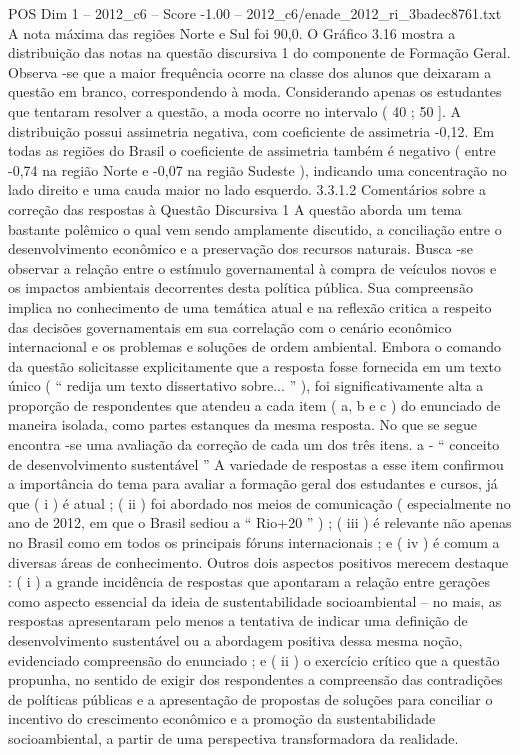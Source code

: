 \begin{textsample}{POS Dim 1 – 2012\_c6 – Score -1.00 – 2012\_c6/enade\_2012\_ri\_3badec8761.txt}
A nota máxima das regiões Norte e Sul foi 90,0.
O Gráfico 3.16 mostra a distribuição das notas na questão discursiva 1 do componente de Formação Geral.
Observa -se que a maior frequência ocorre na classe dos alunos que deixaram a questão em branco, correspondendo à moda.
Considerando apenas os estudantes que tentaram resolver a questão, a moda ocorre no intervalo ( 40 ; 50 ].
A distribuição possui assimetria negativa, com coeficiente de assimetria -0,12.
Em todas as regiões do Brasil o coeficiente de assimetria também é negativo ( entre -0,74 na região Norte e -0,07 na região Sudeste ), indicando uma concentração no lado direito e uma cauda maior no lado esquerdo. 3.3.1.2 Comentários sobre a correção das respostas à Questão Discursiva 1 A questão aborda um tema bastante polêmico o qual vem sendo amplamente discutido, a conciliação entre o desenvolvimento econômico e a preservação dos recursos naturais.
Busca -se observar a relação entre o estímulo governamental à compra de veículos novos e os impactos ambientais decorrentes desta política pública.
Sua compreensão implica no conhecimento de uma temática atual e na reflexão critica a respeito das decisões governamentais em sua correlação com o cenário econômico internacional e os problemas e soluções de ordem ambiental.
Embora o comando da questão solicitasse explicitamente que a resposta fosse fornecida em um texto único ( “ redija um texto dissertativo sobre... ” ), foi significativamente alta a proporção de respondentes que atendeu a cada item ( a, b e c ) do enunciado de maneira isolada, como partes estanques da mesma resposta.
No que se segue encontra -se uma avaliação da correção de cada um dos três itens. a - “ conceito de desenvolvimento sustentável ” A variedade de respostas a esse item confirmou a importância do tema para avaliar a formação geral dos estudantes e cursos, já que ( i ) é atual ; ( ii ) foi abordado nos meios de comunicação ( especialmente no ano de 2012, em que o Brasil sediou a “ Rio+20 ” ) ; ( iii ) é relevante não apenas no Brasil como em todos os principais fóruns internacionais ; e ( iv ) é comum a diversas áreas de conhecimento.
Outros dois aspectos positivos merecem destaque : ( i ) a grande incidência de respostas que apontaram a relação entre gerações como aspecto essencial da ideia de sustentabilidade socioambiental – no mais, as respostas apresentaram pelo menos a tentativa de indicar uma definição de desenvolvimento sustentável ou a abordagem positiva dessa mesma noção, evidenciado compreensão do enunciado ; e ( ii ) o exercício crítico que a questão propunha, no sentido de exigir dos respondentes a compreensão das contradições de políticas públicas e a apresentação de propostas de soluções para conciliar o incentivo do crescimento econômico e a promoção da sustentabilidade socioambiental, a partir de uma perspectiva transformadora da realidade.

\end{textsample}
